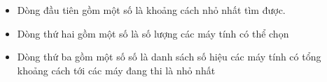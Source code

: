 \begin{itemize}
	\item     Dòng đầu tiên gồm một số là khoảng cách nhỏ nhất tìm được.   
	\item     Dòng thứ hai gồm một số là số lượng các máy tính có thể chọn   
	\item     Dòng thứ ba gồm một số số là danh sách số hiệu các máy tính có tổng khoảng cách tới các máy đang thi là nhỏ nhất   
\end{itemize}